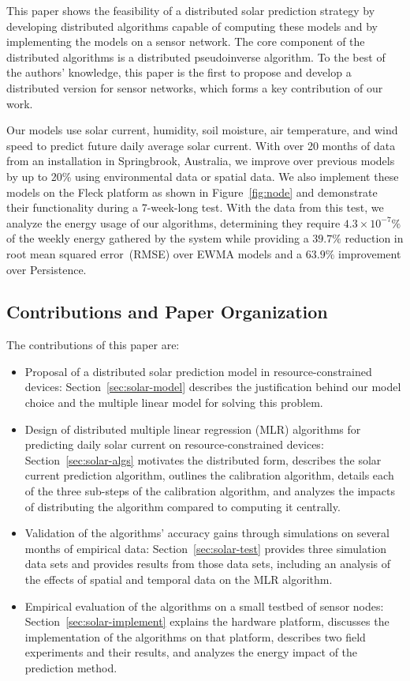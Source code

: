 \documentclass[prodmode,acmtosn]{acmsmall}
\begin{document}
This paper shows the feasibility of a distributed solar prediction strategy by developing distributed algorithms capable of computing these models and by implementing the models on a sensor network.
The core component of the distributed algorithms is a distributed pseudoinverse algorithm. To the best of the authors' knowledge, this paper is the first to propose and develop a distributed version for sensor networks, which forms a key contribution of our work.

Our models use solar current, humidity, soil moisture, air temperature, and wind speed to predict future daily average solar current.
With over 20 months of data from an installation in Springbrook, Australia, we improve over  previous models by up to 20\% using environmental data  or spatial data.
We also implement these models on the Fleck platform as shown in Figure~\ref{fig:node} and demonstrate their functionality during a 7-week-long test.
With the data from this test, we analyze the energy usage of our algorithms, determining they require $4.3\times10^{-7}\%$ of the weekly energy gathered by the system while providing a $39.7\%$  reduction in root mean squared error~(RMSE) over EWMA models and a $63.9\%$ improvement over Persistence.

\subsection{Contributions and Paper Organization}
The contributions of this paper are:
\begin{itemize}
\item Proposal of a distributed solar prediction model in resource-constrained devices: Section~\ref{sec:solar-model} describes the justification behind our model choice and the multiple linear model for solving this problem.
\item Design of distributed multiple linear regression (MLR) algorithms for predicting daily solar current on resource-constrained devices: Section~\ref{sec:solar-algs} motivates the distributed form, describes the solar current prediction algorithm, outlines the calibration algorithm, details each of the three sub-steps of the calibration algorithm, and analyzes the impacts of distributing the algorithm compared to computing it centrally.
\item Validation of the algorithms' accuracy gains through simulations on several months of empirical data: Section~\ref{sec:solar-test} provides three simulation data sets and provides results from those data sets, including an analysis of the effects of spatial and temporal data on the MLR algorithm.
\item Empirical evaluation of the algorithms on a small testbed of sensor nodes: Section~\ref{sec:solar-implement} explains the hardware platform, discusses the implementation of the algorithms on that platform, describes two field experiments and their results, and analyzes the energy impact of the prediction method.
\end{itemize}
\end{document}
